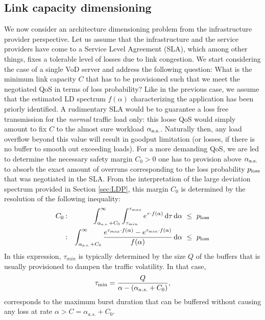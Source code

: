\documentclass[twoside]{article}
\begin{document}
\subsection{Link capacity dimensioning}
\label{sec:serv}

We now consider an architecture dimensioning problem from  the infrastructure provider perspective. Let us assume that the infrastructure and the service providers have come to a Service Level Agreement (SLA), which among  other things, fixes a tolerable level of losses due to link congestion.  We start considering the case of a single VoD server and address the following question: What is the minimum link capacity $C$ that has to be provisioned  such that we meet the negotiated QoS in terms of loss probability? Like in the previous case, we assume that the estimated LD spectrum $f(\alpha)$ characterizing the application has been priorly identified. A rudimentary SLA would be to  guarantee a loss free transmission for  the {\em normal} traffic load only: this loose QoS would simply amount to fix $C$ to the almost sure workload $\alpha_{\rm a.s.}$. Naturally then, any load overflow beyond this value will result in goodput limitation (or losses, if there is no buffer to smooth out exceeding loads). For a more demanding QoS, we are led to determine the necessary safety margin $C_0>0$ one has to provision above $\alpha_{\rm a.s.}$ to absorb the exact amount of overruns corresponding to the loss probability $p_{\rm loss}$ that was negotiated in the SLA.  From the interpretation of the large deviation spectrum provided in Section \ref{sec:LDP},  this margin $C_0$ is determined by the resolution of the following inequality:
\begin{eqnarray}
C_0 & \:{\rm :} &  \int_{\alpha_{\rm a.s.}+C_0}^{\infty} \int_{\tau_{min}}^{\tau_{max}} e^{\tau\cdot f(\alpha)}\,{\rm d}\tau\,{\rm d}\alpha~ \leq ~p_{\rm loss} \nonumber \\\label{eq:ploss-1}
& \:{\rm :} &\int_{\alpha_{\rm a.s.}+C_0}^{\infty} \frac{e^{\tau_{max}\cdot f(\alpha)}-e^{\tau_{min}\cdot f(\alpha)}}{f(\alpha)} \,{\rm d}\alpha ~\leq ~p_{\rm loss}
\end{eqnarray}
In this expression,  $\tau_{min}$ is typically  determined by the size $Q$ of the buffers that is usually provisioned to dampen the traffic volatility. In that case,
\begin{equation}
\tau_{\rm min} = \frac{Q}{\alpha-(\alpha_{a.s.}+C_0)},
\label{eq:tau_min}
\end{equation} 
corresponds to the maximum burst duration that can be buffered without causing any loss at rate $\alpha>C=\alpha_{a.s.}+C_0$.  
\end{document}
